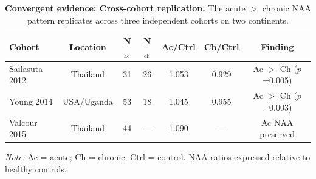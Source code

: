 \documentclass[10pt,a4paper]{article}
\begin{document}
\begin{table}[htbp]
\centering
\caption{\textbf{Convergent evidence: Cross-cohort replication.} The acute $>$ chronic NAA pattern replicates across three independent cohorts on two continents.}
\label{tab:convergent_cohorts}
\small
\begin{tabular}{lcccccc}
\toprule
\textbf{Cohort} & \textbf{Location} & \textbf{N$_{\text{ac}}$} & \textbf{N$_{\text{ch}}$} & \textbf{Ac/Ctrl} & \textbf{Ch/Ctrl} & \textbf{Finding} \\
\midrule
Sailasuta 2012 & Thailand & 31 & 26 & 1.053 & 0.929 & Ac $>$ Ch ($p$=0.005) \\
Young 2014 & USA/Uganda & 53 & 18 & 1.045 & 0.955 & Ac $>$ Ch ($p$=0.003) \\
Valcour 2015 & Thailand & 44 & --- & 1.090 & --- & Ac NAA preserved \\
\bottomrule
\end{tabular}
\smallskip

\noindent\textit{Note:} Ac = acute; Ch = chronic; Ctrl = control. NAA ratios expressed relative to healthy controls.
\end{table}




\end{document}
